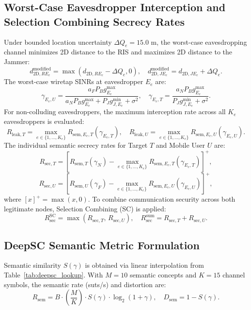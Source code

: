 \documentclass[journal,onecolumn]{IEEEtran}
\begin{document}
\subsection{Worst-Case Eavesdropper Interception and Selection Combining Secrecy Rates}
Under bounded location uncertainty $\Delta Q_e = 15.0\text{ m}$, the worst-case eavesdropping channel minimizes 2D distance to the RIS and maximizes 2D distance to the Jammer:
\begin{equation}
    d_{\text{2D}, RE_e}^{\text{modified}} = \max(d_{\text{2D}, RE_e} - \Delta Q_e, 0), \quad
    d_{\text{2D}, JE_e}^{\text{modified}} = d_{\text{2D}, JE_e} + \Delta Q_e.
\end{equation}
The worst-case wiretap SINRs at eavesdropper $E_e$ are:
\begin{equation}
    \gamma_{E_e, U} = \frac{a_F P_B g_{E_e}^{\max}}{a_N P_B g_{E_e}^{\max} + P_J g_{J, E_e}^{\min} + \sigma^2}, \quad
    \gamma_{E_e, T} = \frac{a_N P_B g_{E_e}^{\max}}{P_J g_{J, E_e}^{\min} + \sigma^2}.
\end{equation}
For non-colluding eavesdroppers, the maximum interception rate across all $K_e$ eavesdroppers is evaluated:
\begin{equation}
    R_{\text{leak}, T} = \max_{e \in \{1, \dots, K_e\}} R_{\text{sem}, E_e, T}(\gamma_{E_e, T}), \quad
    R_{\text{leak}, U} = \max_{e \in \{1, \dots, K_e\}} R_{\text{sem}, E_e, U}(\gamma_{E_e, U}).
\end{equation}
The individual semantic secrecy rates for Target $T$ and Mobile User $U$ are:
\begin{equation}
    R_{\text{sec}, T} = \left[ R_{\text{sem}, T}(\gamma_N) - \max_{e \in \{1, \dots, K_e\}} R_{\text{sem}, E_e, T}(\gamma_{E_e, T}) \right]^+,
\end{equation}
\begin{equation}
    R_{\text{sec}, U} = \left[ R_{\text{sem}, U}(\gamma_F) - \max_{e \in \{1, \dots, K_e\}} R_{\text{sem}, E_e, U}(\gamma_{E_e, U}) \right]^+,
\end{equation}
where $[x]^+ = \max(x, 0)$. To combine communication security across both legitimate nodes, Selection Combining (SC) is applied:
\begin{equation}
    R_{\text{sec}}^{\text{SC}} = \max\left( R_{\text{sec}, T},\, R_{\text{sec}, U} \right), \quad R_{\text{sec}}^{\text{sum}} = R_{\text{sec}, T} + R_{\text{sec}, U}.
\end{equation}

\subsection{DeepSC Semantic Metric Formulation}
Semantic similarity $S(\gamma)$ is obtained via linear interpolation from Table~\ref{tab:deepsc_lookup}. With $M=10$ semantic concepts and $K=15$ channel symbols, the semantic rate (suts/s) and distortion are:
\begin{equation}
    R_{\text{sem}} = B \cdot \left( \frac{M}{K} \right) \cdot S(\gamma) \cdot \log_2(1 + \gamma), \quad D_{\text{sem}} = 1 - S(\gamma).
\end{equation}
\end{document}
